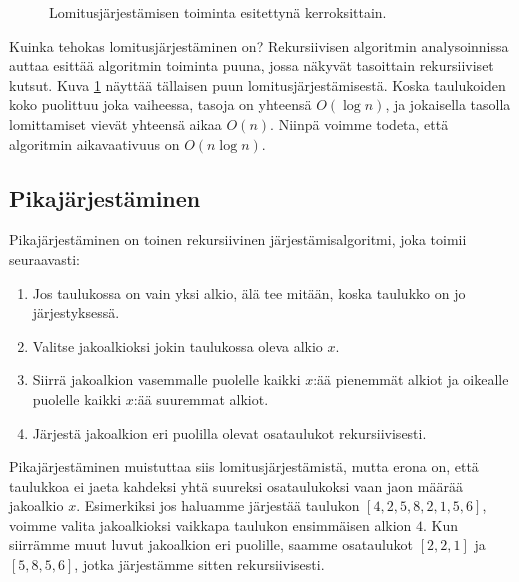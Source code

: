 \begin{figure}
\center
{}
\caption{Lomitusjärjestämisen toiminta esitettynä kerroksittain.}
\label{fig:lomjar}
\end{figure}

Kuinka tehokas lomitusjärjestäminen on?
Rekursiivisen algoritmin analysoinnissa auttaa esittää
algoritmin toiminta puuna,
jossa näkyvät tasoittain rekursiiviset kutsut.
Kuva \ref{fig:lomjar} näyttää tällaisen puun lomitusjärjestämisestä.
Koska taulukoiden koko puolittuu joka vaiheessa,
tasoja on yhteensä $O(\log n)$,
ja jokaisella tasolla lomittamiset vievät yhteensä aikaa $O(n)$.
Niinpä voimme todeta, että algoritmin aikavaativuus on $O(n \log n)$.

\subsection{Pikajärjestäminen}

Pikajärjestäminen on toinen rekursiivinen järjestämisalgoritmi,
joka toimii seuraavasti:

\begin{enumerate}
\item Jos taulukossa on vain yksi alkio,
älä tee mitään, koska taulukko on jo järjestyksessä.
\item Valitse jakoalkioksi jokin taulukossa oleva alkio $x$.
\item Siirrä jakoalkion vasemmalle puolelle kaikki $x$:ää pienemmät alkiot
ja oikealle puolelle kaikki $x$:ää suuremmat alkiot.
\item Järjestä jakoalkion eri puolilla olevat osataulukot rekursiivisesti.
\end{enumerate}

Pikajärjestäminen muistuttaa siis lomitusjärjestämistä,
mutta erona on, että taulukkoa ei jaeta kahdeksi yhtä suureksi
osataulukoksi vaan jaon määrää jakoalkio $x$.
Esimerkiksi jos haluamme järjestää taulukon $[4,2,5,8,2,1,5,6]$,
voimme valita jakoalkioksi vaikkapa taulukon ensimmäisen alkion $4$.
Kun siirrämme muut luvut jakoalkion eri puolille,
saamme osataulukot $[2,2,1]$ ja $[5,8,5,6]$, jotka järjestämme
sitten rekursiivisesti.

